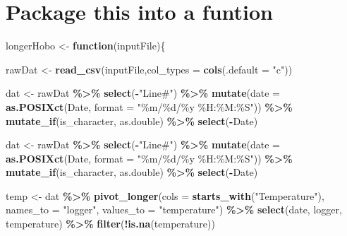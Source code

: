 \documentclass[]{article}
\newenvironment{Shaded}{\begin{snugshade}}{\end{snugshade}}
\newcommand{\ControlFlowTok}[1]{\textcolor[rgb]{0.13,0.29,0.53}{\textbf{#1}}}
\newcommand{\DataTypeTok}[1]{\textcolor[rgb]{0.13,0.29,0.53}{#1}}
\newcommand{\KeywordTok}[1]{\textcolor[rgb]{0.13,0.29,0.53}{\textbf{#1}}}
\newcommand{\NormalTok}[1]{#1}
\newcommand{\OperatorTok}[1]{\textcolor[rgb]{0.81,0.36,0.00}{\textbf{#1}}}
\newcommand{\StringTok}[1]{\textcolor[rgb]{0.31,0.60,0.02}{#1}}
\begin{document}
\hypertarget{package-this-into-a-funtion}{%
\section{Package this into a
funtion}\label{package-this-into-a-funtion}}

\begin{Shaded}
\begin{Highlighting}[]
\NormalTok{longerHobo <{-}}\StringTok{ }\ControlFlowTok{function}\NormalTok{(inputFile)\{}
  
\NormalTok{  rawDat <{-}}\StringTok{ }\KeywordTok{read\_csv}\NormalTok{(inputFile,}\DataTypeTok{col\_types =} \KeywordTok{cols}\NormalTok{(}\DataTypeTok{.default =} \StringTok{"c"}\NormalTok{))}

\NormalTok{  dat <{-}}\StringTok{ }\NormalTok{rawDat }\OperatorTok{\%>\%}\StringTok{  }
\StringTok{    }\KeywordTok{select}\NormalTok{(}\OperatorTok{{-}}\StringTok{"Line\#"}\NormalTok{) }\OperatorTok{\%>\%}\StringTok{ }
\StringTok{    }\KeywordTok{mutate}\NormalTok{(}\DataTypeTok{date =} \KeywordTok{as.POSIXct}\NormalTok{(Date, }\DataTypeTok{format =} \StringTok{"\%m/\%d/\%y \%H:\%M:\%S"}\NormalTok{)) }\OperatorTok{\%>\%}\StringTok{ }
\StringTok{    }\KeywordTok{mutate\_if}\NormalTok{(is\_character, as.double) }\OperatorTok{\%>\%}\StringTok{ }
\StringTok{    }\KeywordTok{select}\NormalTok{(}\OperatorTok{{-}}\NormalTok{Date)}

\NormalTok{    dat <{-}}\StringTok{ }\NormalTok{rawDat }\OperatorTok{\%>\%}\StringTok{  }
\StringTok{  }\KeywordTok{select}\NormalTok{(}\OperatorTok{{-}}\StringTok{"Line\#"}\NormalTok{) }\OperatorTok{\%>\%}\StringTok{ }
\StringTok{  }\KeywordTok{mutate}\NormalTok{(}\DataTypeTok{date =} \KeywordTok{as.POSIXct}\NormalTok{(Date, }\DataTypeTok{format =} \StringTok{"\%m/\%d/\%y \%H:\%M:\%S"}\NormalTok{)) }\OperatorTok{\%>\%}\StringTok{ }
\StringTok{  }\KeywordTok{mutate\_if}\NormalTok{(is\_character, as.double) }\OperatorTok{\%>\%}\StringTok{ }
\StringTok{  }\KeywordTok{select}\NormalTok{(}\OperatorTok{{-}}\NormalTok{Date)}
 
   
\NormalTok{  temp <{-}}\StringTok{ }\NormalTok{dat }\OperatorTok{\%>\%}\StringTok{ }
\StringTok{    }\KeywordTok{pivot\_longer}\NormalTok{(}\DataTypeTok{cols =} \KeywordTok{starts\_with}\NormalTok{(}\StringTok{"Temperature"}\NormalTok{),}
               \DataTypeTok{names\_to =} \StringTok{"logger"}\NormalTok{,}
               \DataTypeTok{values\_to =} \StringTok{"temperature"}\NormalTok{) }\OperatorTok{\%>\%}\StringTok{ }
\StringTok{    }\KeywordTok{select}\NormalTok{(date,}
\NormalTok{         logger,}
\NormalTok{         temperature) }\OperatorTok{\%>\%}\StringTok{ }
\StringTok{    }\KeywordTok{filter}\NormalTok{(}\OperatorTok{!}\KeywordTok{is.na}\NormalTok{(temperature))}


\end{Highlighting}
\end{Shaded}
\end{document}
